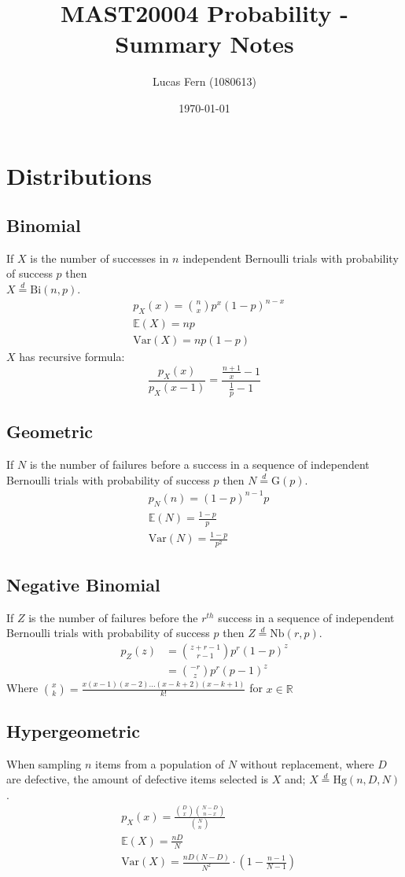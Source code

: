 \documentclass[titlepage,twocolumn]{article}
\title{MAST20004 Probability - Summary Notes}
\date{\today}
\author{Lucas Fern (1080613)}
\begin{document}
\section*{Distributions}
\subsection*{Binomial}
If $X$ is the number of successes in $n$ independent Bernoulli trials with probability of success $p$ then\\$X\stackrel{d}{=}\mbox{Bi}(n,p)$.
\begin{align*}
    &p_X(x)={\binom{n}{x}}p^x(1-p)^{n-x}\\
    &\mathbb{E}(X)=np\\
    &\mbox{Var}(X)=np(1-p)
\end{align*}
$X$ has recursive formula: $$\frac{p_X(x)}{p_X(x-1)}=\frac{\frac{n+1}{x}-1}{\frac{1}{p}-1}$$

\subsection*{Geometric}
If $N$ is the number of failures before a success in a sequence of independent Bernoulli trials with probability of success $p$ then $N\stackrel{d}{=}\mbox{G}(p)$.
\begin{align*}
    &p_N(n)=(1-p)^{n-1}p\\
    &\mathbb{E}(N)=\frac{1-p}{p}\\
    &\mbox{Var}(N)=\frac{1-p}{p^2}
\end{align*}

\subsection*{Negative Binomial}
If $Z$ is the number of failures before the $r^{th}$ success in a sequence of independent Bernoulli trials with probability of success $p$ then $Z\stackrel{d}{=}\mbox{Nb}(r,p)$.
\begin{align*}
    p_Z(z)&={\binom{z+r-1}{r-1}}p^r(1-p)^z\\
    &={\binom{-r}{z}}p^r(p-1)^z
\end{align*}
Where ${\binom{x}{k}} = \frac{x(x-1)(x-2)...(x-k+2)(x-k+1)}{k!}$ for $x \in \mathbb{R}$

\subsection*{Hypergeometric}
When sampling $n$ items from a population of $N$ without replacement, where $D$ are defective, the amount of defective items selected is $X$ and; $X\stackrel{d}{=}\mbox{Hg}(n,D,N)$.
\begin{align*}
    &p_X(x)=\frac{{\binom{D}{x}}{\binom{N-D}{n-x}}}{{\binom{N}{n}}}\\
    &\mathbb{E}(X)=\frac{nD}{N}\\
    &\mbox{Var}(X)=\frac{nD(N-D)}{N^2}\cdot(1-\frac{n-1}{N-1})
\end{align*}
\vfill
\end{document}
